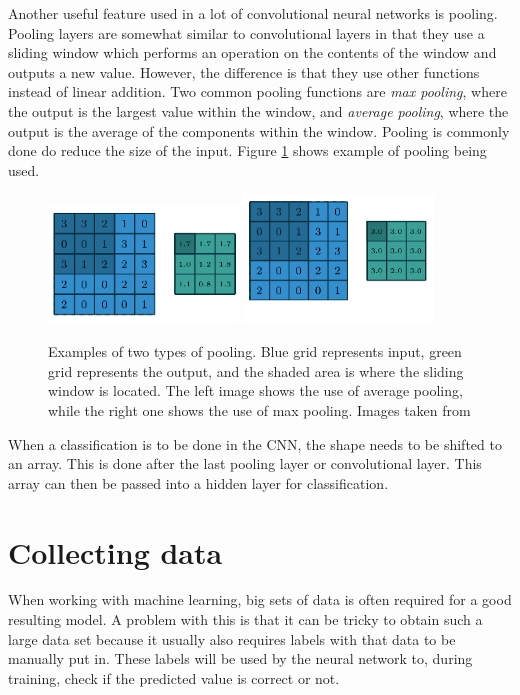  
 Another useful feature used in a lot of convolutional neural networks is pooling. Pooling layers are somewhat similar to convolutional layers in that they use a sliding window which performs an operation on the contents of the window and outputs a new value. However, the difference is that they use other functions instead of linear addition. Two common pooling functions are \textit{max pooling}, where the output is the largest value within the window, and \textit{average pooling}, where the output is the average of the components within the window.  Pooling is commonly done do reduce the size of the input. Figure \ref{fig:pooling} shows example of pooling being used.
 
 \begin{figure}[hbtp]
\begin{center}
\includegraphics[width = 0.45\textwidth]{./Images/avgPool.png}
\includegraphics[width = 0.45\textwidth]{./Images/maxPool.png}
\caption{Examples of two types of pooling. Blue grid represents input, green grid represents the output, and the shaded area is where the sliding window is located. The left image shows the use of average pooling, while the right one shows the use of max pooling.
Images taken from \cite{convArit}}
\label{fig:pooling}
\end{center}
\end{figure} 
 
When a classification is to be done in the CNN, the shape needs to be shifted to an array. This is done after the last pooling layer or convolutional layer. This array can then be passed into a hidden layer for classification.


\section{Collecting data}
\label{sec:NNdata}
When working with machine learning, big sets of data is often required for a good resulting model.
A problem with this is that it can be tricky to obtain such a large data set because it usually also requires
labels with that data to be manually put in. These labels will be used by the neural network to, during training, check if
the predicted value is correct or not.

